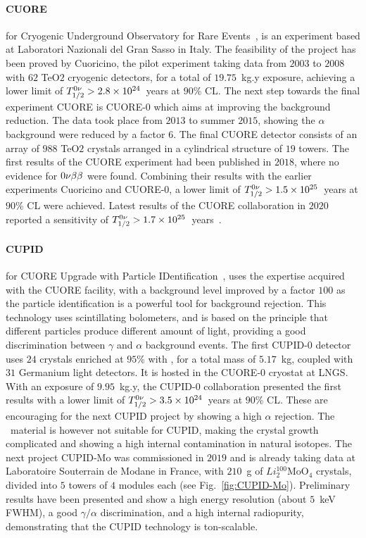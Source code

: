 \paragraph{CUORE} for Cryogenic Underground Observatory for Rare Events~\cite{art:CUORE_2019}, is an experiment based at Laboratori Nazionali del Gran Sasso in Italy.
The feasibility of the project has been proved by Cuoricino, the pilot experiment taking data from $2003$ to $2008$ with $62$ TeO$2$ cryogenic detectors, for a total of $19.75$~kg.y exposure, achieving a lower limit of $T_{1/2}^{0\nu}>2.8\times 10^{24}$~years at $90$\% CL.
The next step towards the final experiment CUORE is CUORE-$0$ which aims at improving the background reduction.
The data took place from $2013$ to summer $2015$, showing the $\alpha$ background were reduced by a factor $6$.
The final CUORE detector consists of an array of $988$ TeO$2$ crystals arranged in a cylindrical structure of $19$ towers.
The first results of the CUORE experiment had been published in $2018$, where no evidence for $0\nu\beta\beta$ were found.
Combining their results with the earlier experiments Cuoricino and CUORE-$0$, a lower limit of $T_{1/2}^{0\nu}>1.5\times 10^{25}$~years at $90$\% CL were achieved.
Latest results of the CUORE collaboration in $2020$ reported a sensitivity of $T_{1/2}^{0\nu}>1.7\times 10^{25}$~years~\cite{art:CUORE_2020}.


\paragraph{CUPID} for CUORE Upgrade with Particle IDentification~\cite{art:CUPID_2015}, uses the expertise acquired with the CUORE facility, with a background level improved by a factor $100$ as the particle identification is a powerful tool for background rejection.
This technology uses scintillating bolometers, and is based on the principle that different particles produce different amount of light, providing a good discrimination between $\gamma$ and $\alpha$ background events.
The first CUPID-$0$ detector uses $24$ crystals enriched at $95$\% with \Se, for a total mass of $5.17$~kg, coupled with $31$ Germanium light detectors.
It is hosted in the CUORE-$0$ cryostat at LNGS.
With an exposure of $9.95$~kg.y, the CUPID-$0$ collaboration presented the first results with a lower limit of $T_{1/2}^{0\nu}>3.5\times 10^{24}$~years at $90$\% CL.
These are encouraging for the next CUPID project by showing a high $\alpha$ rejection.
The \Se\ material is however not suitable for CUPID, making the crystal growth complicated and showing a high internal contamination in natural isotopes.
The next project CUPID-Mo was commissioned in $2019$ and is already taking data at Laboratoire Souterrain de Modane in France, with $210$~g of $Li_2^{100}$MoO$_4$ crystals, divided into $5$ towers of $4$ modules each (see Fig.~\ref{fig:CUPID-Mo}).
Preliminary results have been presented and show a high energy resolution (about $5$~keV FWHM), a good $\gamma/\alpha$ discrimination, and a high internal radiopurity, demonstrating that the CUPID technology is ton-scalable.

